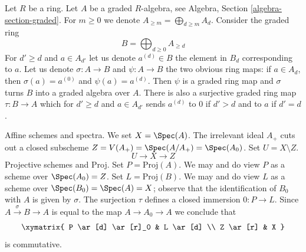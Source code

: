 \medskip\noindent
Let $R$ be a ring. Let $A$ be a graded $R$-algebra, see
Algebra, Section \ref{algebra-section-graded}.
For $m \geq 0$ we denote $A_{\geq m} = \bigoplus_{d \geq m} A_d$.
Consider the graded ring
$$
B = \bigoplus\nolimits_{d \geq 0} A_{\geq d}
$$
For $d' \geq d$ and $a \in A_{d'}$ let us denote $a^{(d)} \in B$
the element in $B_d$ corresponding to $a$.
Let us denote $\sigma : A \to B$ and $\psi : A \to B$
the two obvious ring maps: if $a \in A_d$, then
$\sigma(a) = a^{(0)}$ and $\psi(a) = a^{(d)}$.
Then $\psi$ is a graded ring map and $\sigma$ turns $B$
into a graded algebra over $A$. There is also a
surjective graded ring map $\tau : B \to A$
which for $d' \geq d$ and $a \in A_{d'}$ sends
$a^{(d)}$ to $0$ if $d' > d$ and to $a$ if $d' = d$.

\medskip\noindent
Affine schemes and spectra.
We set $X = \Spec(A)$. The irrelevant ideal $A_+$ cuts out a closed subscheme
$Z = V(A_+) = \Spec(A/A_+) = \Spec(A_0)$. Set $U = X \setminus Z$.
$$
U \longrightarrow X \longrightarrow Z
$$
Projective schemes and Proj. Set $P = \text{Proj}(A)$. We may
and do view $P$ as a scheme over $\Spec(A_0) = Z$.
Set $L = \text{Proj}(B)$. We may and do view $L$ as a scheme
over $\Spec(B_0) = \Spec(A) = X$; observe that the identification
of $B_0$ with $A$ is given by $\sigma$.
The surjection $\tau$ defines a closed immersion $0 : P \to L$.
Since $A \xrightarrow{\sigma} B \to A$ is equal to the map $A \to A_0 \to A$
we conclude that
$$
\xymatrix{
P \ar[d] \ar[r]_0 & L \ar[d] \\
Z \ar[r] & X
}
$$
is commutative.
